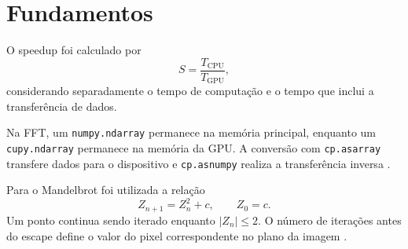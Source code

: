 \section{Fundamentos}

O speedup foi calculado por
\begin{equation}
    S = \frac{T_{\mathrm{CPU}}}{T_{\mathrm{GPU}}},
\end{equation}
considerando separadamente o tempo de computação e o tempo que inclui a
transferência de dados.

Na FFT, um \texttt{numpy.ndarray} permanece na memória principal, enquanto um
\texttt{cupy.ndarray} permanece na memória da GPU. A conversão com
\texttt{cp.asarray} transfere dados para o dispositivo e \texttt{cp.asnumpy}
realiza a transferência inversa \autocite{cupy}.

Para o Mandelbrot foi utilizada a relação
\begin{equation}
    Z_{n+1} = Z_n^2 + c, \qquad Z_0 = c.
\end{equation}
Um ponto continua sendo iterado enquanto $|Z_n|\leq 2$. O número de iterações
antes do escape define o valor do pixel correspondente no plano da imagem
\autocite{mandelbrot}.
